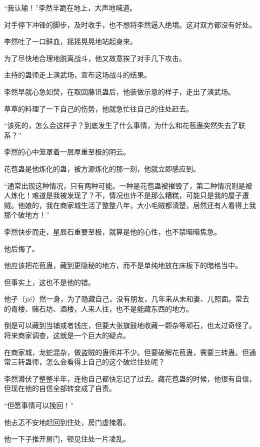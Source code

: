 
\begin{this_body}

“我认输！”李然半跪在地上，大声地喊道。

对手停下冲锋的脚步，及时收手，也不想将李然逼入绝境。这对双方都没有好处。

李然吐了一口鲜血，摇摇晃晃地站起身来。

为了尽快地合理地脱离战斗，他又故意挨了对手几下攻击。

主持的蛊师走上演武场，宣布这场战斗的结果。

李然早就心急如焚，在取回藤讯蛊后，他装做示意的样子，走出了演武场。

草草的料理了一下自己的伤势，他就急忙往自己的住处赶去。

“该死的，怎么会这样子？到底发生了什么事情，为什么和花苞蛊突然失去了联系？”

李然的心中笼罩着一层厚重至极的阴云。

花苞蛊是他炼化的蛊，被方源炼化的那一刻，他就立即感应到。

“通常出现这种情况，只有两种可能。一种是花苞蛊被摧毁了，第二种情况则是被人炼化！难道是我被发现了？不，情况也许不是那么糟糕，可能只是我的屋子遭贼。他娘的，我在商家城生活了整整八年，大小毛贼都清楚，居然还有人看得上我那个破地方！”

李然快步而走，星辰石重要至极，就算是他的心性，也不禁暗暗焦急。

他后悔了。

他应该把花苞蛊，藏到更隐秘的地方，而不是单纯地放在床板下的暗格当中。

但事实上，这也不是他的错。

他孑（jié）然一身，为了隐藏自己，没有朋友，几年来从未和妻、儿照面。常去的青楼、赌石坊、酒楼，人来人往，也不是能藏东西的地方。

倒是可以藏到当铺或者钱庄，但要大张旗鼓地收藏一颗杂等顽石，也太过奇怪了。将来商家调查，这就是一个巨大的疑点。

在商家城，龙蛇混杂，做盗贼的蛊师并不少。但要破解花苞蛊，需要三转蛊。但通常三转蛊师，怎么会看得上自己的这个破烂住处呢？

李然潜伏了整整半年，连他自己都快忘记了过去。藏花苞蛊的时候，他很有自信，但现在他的自信全部转变成了自责。

“但愿事情可以挽回！”

他忐忑不安地赶回到住处，房门虚掩着。

他一下子推开房门，顿见住处一片凌乱。


\end{this_body}
